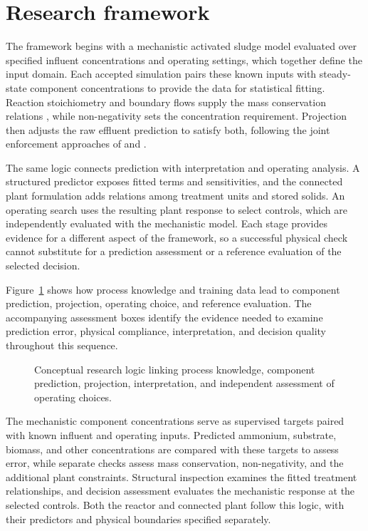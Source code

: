\section{Research framework}

The framework begins with a mechanistic activated sludge model evaluated over specified influent concentrations and operating settings, which together define the input domain. Each accepted simulation pairs these known inputs with steady-state component concentrations to provide the data for statistical fitting. Reaction stoichiometry and boundary flows supply the mass conservation relations \citep{Henze2006,SturmWexler2022}, while non-negativity sets the concentration requirement. Projection then adjusts the raw effluent prediction to satisfy both, following the joint enforcement approaches of \citet{KircherVotsmeier2025} and \citet{Selerio2026}.

The same logic connects prediction with interpretation and operating analysis. A structured predictor exposes fitted terms and sensitivities, and the connected plant formulation adds relations among treatment units and stored solids. An operating search uses the resulting plant response to select controls, which are independently evaluated with the mechanistic model. Each stage provides evidence for a different aspect of the framework, so a successful physical check cannot substitute for a prediction assessment or a reference evaluation of the selected decision.

Figure~\ref{fig:research_conceptual_logic} shows how process knowledge and training data lead to component prediction, projection, operating choice, and reference evaluation. The accompanying assessment boxes identify the evidence needed to examine prediction error, physical compliance, interpretation, and decision quality throughout this sequence.

\begin{figure}[htbp]
\centering

\caption{Conceptual research logic linking process knowledge, component prediction, projection, interpretation, and independent assessment of operating choices.}
\label{fig:research_conceptual_logic}
\end{figure}

The mechanistic component concentrations serve as supervised targets paired with known influent and operating inputs. Predicted ammonium, substrate, biomass, and other concentrations are compared with these targets to assess error, while separate checks assess mass conservation, non-negativity, and the additional plant constraints. Structural inspection examines the fitted treatment relationships, and decision assessment evaluates the mechanistic response at the selected controls. Both the reactor and connected plant follow this logic, with their predictors and physical boundaries specified separately.

